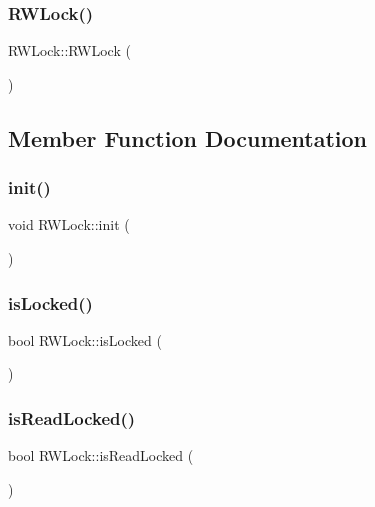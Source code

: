 \subsubsection{\texorpdfstring{R\+W\+Lock()}{RWLock()}}
{\footnotesize\ttfamily R\+W\+Lock\+::\+R\+W\+Lock (\begin{DoxyParamCaption}{ }\end{DoxyParamCaption})\hspace{0.3cm}{\ttfamily [inline]}}



\subsection{Member Function Documentation}
\mbox{\label{classRWLock_a86bb2cfffb42fa153968313033e84c7a}} 
\subsubsection{\texorpdfstring{init()}{init()}}
{\footnotesize\ttfamily void R\+W\+Lock\+::init (\begin{DoxyParamCaption}{ }\end{DoxyParamCaption})\hspace{0.3cm}{\ttfamily [inline]}}

\mbox{\label{classRWLock_a19701f284ca1362468c6571f1bb606b4}} 
\subsubsection{\texorpdfstring{is\+Locked()}{isLocked()}}
{\footnotesize\ttfamily bool R\+W\+Lock\+::is\+Locked (\begin{DoxyParamCaption}{ }\end{DoxyParamCaption})\hspace{0.3cm}{\ttfamily [inline]}}

\mbox{\label{classRWLock_ad8cee8ddb2215d3b614bfe4e1f9532a1}} 
\subsubsection{\texorpdfstring{is\+Read\+Locked()}{isReadLocked()}}
{\footnotesize\ttfamily bool R\+W\+Lock\+::is\+Read\+Locked (\begin{DoxyParamCaption}{ }\end{DoxyParamCaption})\hspace{0.3cm}{\ttfamily [inline]}}

